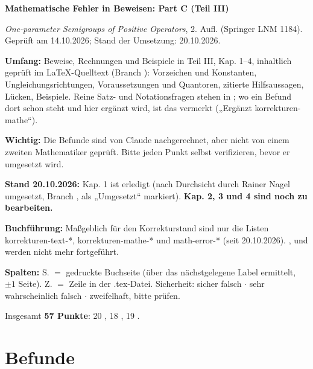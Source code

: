 \documentclass[10pt]{article}
\begin{document}
{\Large\bfseries Mathematische Fehler in Beweisen: Part C (Teil III)\par}
\smallskip
\emph{One-parameter Semigroups of Positive Operators}, 2. Aufl. (Springer LNM 1184). Geprüft am 14.10.2026; Stand der Umsetzung: 20.10.2026.

\textbf{Umfang:} Beweise, Rechnungen und Beispiele in Teil III, Kap. 1–4, inhaltlich geprüft im LaTeX-Quelltext (Branch ): Vorzeichen und Konstanten, Ungleichungsrichtungen, Voraussetzungen und Quantoren, zitierte Hilfsaussagen, Lücken, Beispiele. Reine Satz- und Notationsfragen stehen in ; wo ein Befund dort schon steht und hier ergänzt wird, ist das vermerkt („Ergänzt korrekturen-mathe“).

\textbf{Wichtig:} Die Befunde sind von Claude nachgerechnet, aber nicht von einem zweiten Mathematiker geprüft. Bitte jeden Punkt selbst verifizieren, bevor er umgesetzt wird.

\textbf{Stand 20.10.2026:} Kap. 1 ist erledigt (nach Durchsicht durch Rainer Nagel umgesetzt, Branch , als „Umgesetzt“ markiert). \textbf{Kap. 2, 3 und 4 sind noch zu bearbeiten.}

\textbf{Buchführung:} Maßgeblich für den Korrekturstand sind nur die Listen {korrekturen-text-*}, {korrekturen-mathe-*} und {math-error-*} (seit 20.10.2026). ,  und  werden nicht mehr fortgeführt.

\textbf{Spalten:} S. $=$ gedruckte Buchseite (über das nächstgelegene Label ermittelt, $\ensuremath{\pm}1$ Seite). Z. $=$ Zeile in der .tex-Datei. Sicherheit: \sichA{} sicher falsch $\ensuremath{\cdot}$ \sichB{} sehr wahrscheinlich falsch $\ensuremath{\cdot}$ \sichC{} zweifelhaft, bitte prüfen.

Insgesamt \textbf{57 Punkte}: 20 \sichA{}, 18 \sichB{}, 19 \sichC{}.

\section*{Befunde}
\end{document}
